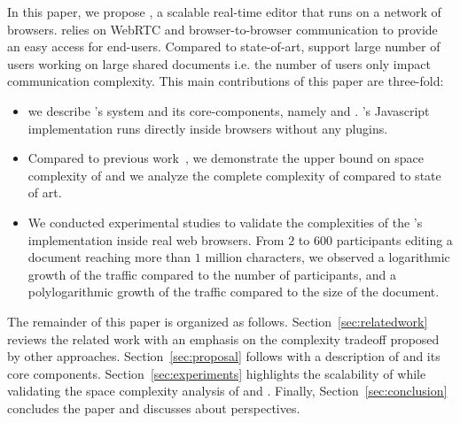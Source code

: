 In this paper, we propose \CRATE, a scalable real-time editor that runs on a network of
browsers. \CRATE relies on WebRTC and browser-to-browser communication to
provide an easy access for end-users. Compared to state-of-art, \CRATE
support large number of users working on large shared
documents i.e. the number of users only impact communication
complexity. This main contributions of this paper are three-fold:
\begin{itemize}
\item we describe \CRATE's system and its core-components, namely \LSEQ and
  \SPRAY. \CRATE's Javascript implementation runs directly inside browsers
  without any plugins.
\item Compared to previous work~\cite{nedelec2013lseq}, we demonstrate the upper
  bound on space complexity of \LSEQ and we analyze the complete complexity of
  \CRATE compared to state of art.
\item We conducted experimental studies to validate the complexities of the
  \CRATE's implementation inside real web browsers. From $2$ to $600$
  participants editing a document reaching more than $1$ million characters, we
  observed a logarithmic growth of the traffic compared to the number of
  participants, and a polylogarithmic growth of the traffic compared to the size
  of the document.
\end{itemize}

The remainder of this paper is organized as
follows. Section~\ref{sec:relatedwork} reviews the related work with an emphasis
on the complexity tradeoff proposed by other
approaches. Section~\ref{sec:proposal} follows with a description of \CRATE and
its core components. Section~\ref{sec:experiments} highlights the scalability of
\CRATE while validating the space complexity analysis of \LSEQ and
\SPRAY. Finally, Section~\ref{sec:conclusion} concludes the paper and discusses
about perspectives.

